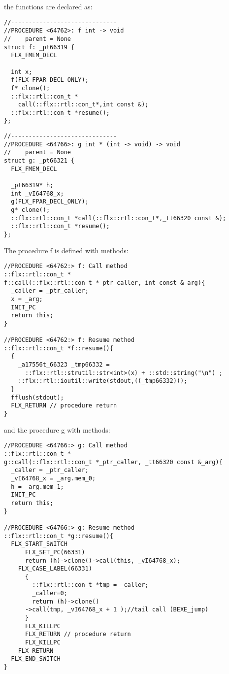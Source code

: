 \documentclass[oneside]{book}
\begin{document}
the functions are declared as:
\begin{verbatim}
//------------------------------
//PROCEDURE <64762>: f int -> void
//    parent = None
struct f: _pt66319 {
  FLX_FMEM_DECL

  int x;
  f(FLX_FPAR_DECL_ONLY);
  f* clone();
  ::flx::rtl::con_t *
    call(::flx::rtl::con_t*,int const &);
  ::flx::rtl::con_t *resume();
};
\end{verbatim}

\begin{verbatim}
//------------------------------
//PROCEDURE <64766>: g int * (int -> void) -> void
//    parent = None
struct g: _pt66321 {
  FLX_FMEM_DECL

  _pt66319* h;
  int _vI64768_x;
  g(FLX_FPAR_DECL_ONLY);
  g* clone();
  ::flx::rtl::con_t *call(::flx::rtl::con_t*,_tt66320 const &);
  ::flx::rtl::con_t *resume();
};
\end{verbatim}

The procedure f is defined with methods:
\begin{verbatim}
//PROCEDURE <64762:> f: Call method
::flx::rtl::con_t * 
f::call(::flx::rtl::con_t *_ptr_caller, int const &_arg){
  _caller = _ptr_caller;
  x = _arg;
  INIT_PC
  return this;
}

//PROCEDURE <64762:> f: Resume method
::flx::rtl::con_t *f::resume(){
  {
    _a17556t_66323 _tmp66332 =
      ::flx::rtl::strutil::str<int>(x) + ::std::string("\n") ;
    ::flx::rtl::ioutil::write(stdout,((_tmp66332)));
  }
  fflush(stdout);
  FLX_RETURN // procedure return
}
\end{verbatim}

and the procedure g with methods:
\begin{verbatim}
//PROCEDURE <64766:> g: Call method
::flx::rtl::con_t * 
g::call(::flx::rtl::con_t *_ptr_caller, _tt66320 const &_arg){
  _caller = _ptr_caller;
  _vI64768_x = _arg.mem_0;
  h = _arg.mem_1;
  INIT_PC
  return this;
}

//PROCEDURE <64766:> g: Resume method
::flx::rtl::con_t *g::resume(){
  FLX_START_SWITCH
      FLX_SET_PC(66331)
      return (h)->clone()->call(this, _vI64768_x);
    FLX_CASE_LABEL(66331)
      {
        ::flx::rtl::con_t *tmp = _caller;
        _caller=0;
        return (h)->clone()
      ->call(tmp, _vI64768_x + 1 );//tail call (BEXE_jump)
      }
      FLX_KILLPC
      FLX_RETURN // procedure return
      FLX_KILLPC
    FLX_RETURN
  FLX_END_SWITCH
}
\end{verbatim}
\end{document}
